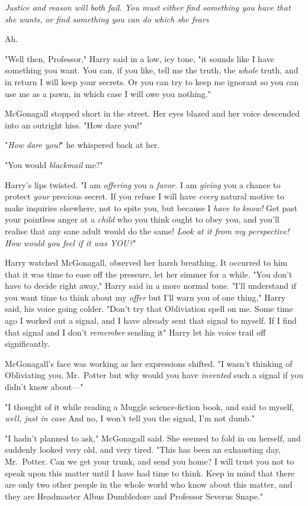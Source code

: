 \emph{Justice and reason will both fail. You must either find something you
have that she wants, or find something you can do which she fears{\el}}

Ah.

"Well then, Professor," Harry said in a low, icy tone, "it sounds like I have
something you want. You can, if you like, tell me the truth, the \emph{whole}
truth, and in return I will keep your secrets. Or you can try to keep me
ignorant so you can use me as a pawn, in which case I will owe you nothing."

McGonagall stopped short in the street. Her eyes blazed and her voice descended
into an outright hiss. "How dare you!"

"\emph{How dare you!}" he whispered back at her.

"You would \emph{blackmail} me?"

Harry's lips twisted. "I am \emph{offering} you a \emph{favor.} I am
\emph{giving} you a chance to protect \emph{your} precious secret. If you
refuse I will have \emph{every} natural motive to make inquiries elsewhere, not
to spite you, but because I \emph{have to know!} Get past your pointless anger
at a \emph{child} who you think ought to obey you, and you'll realise that any
sane adult would do the same! \emph{Look at it from my perspective! How would
you feel if it was YOU?}"

Harry watched McGonagall, observed her harsh breathing. It occurred to him that
it was time to ease off the pressure, let her simmer for a while. "You don't
have to decide right away," Harry said in a more normal tone. "I'll understand
if you want time to think about my \emph{offer}{\el} but I'll warn you of
one thing," Harry said, his voice going colder. "Don't try that Obliviation
spell on me. Some time ago I worked out a signal, and I have already sent that
signal to myself. If I find that signal and I don't \emph{remember} sending
it{\el}" Harry let his voice trail off significantly.

McGonagall's face was working as her expressions shifted. "I{\el} wasn't
thinking of Obliviating you, Mr.~Potter{\el} but why would you have
\emph{invented} such a signal if you didn't know about—"

"I thought of it while reading a Muggle science-fiction book, and said to
myself, \emph{well, just in case{\el}} And no, I won't tell you the signal,
I'm not dumb."

"I hadn't planned to ask," McGonagall said. She seemed to fold in on herself,
and suddenly looked very old, and very tired. "This has been an exhausting day,
Mr.~Potter. Can we get your trunk, and send you home? I will trust you not to
speak upon this matter until I have had time to think. Keep in mind that there
are only two other people in the whole world who know about this matter, and
they are Headmaster Albus Dumbledore and Professor Severus Snape."

